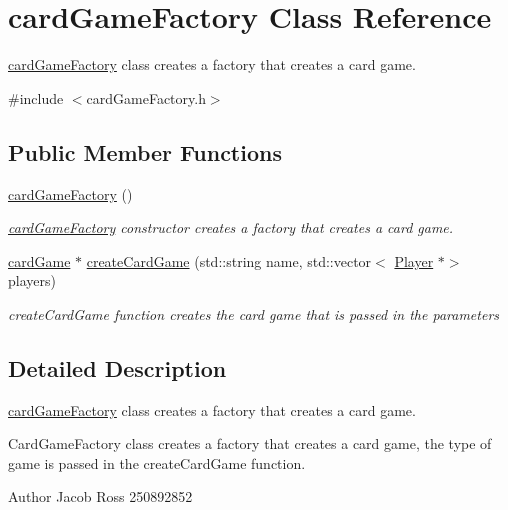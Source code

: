 \hypertarget{classcardGameFactory}{}\section{card\+Game\+Factory Class Reference}
\label{classcardGameFactory}


\hyperlink{classcardGameFactory}{card\+Game\+Factory} class creates a factory that creates a card game.  




{\ttfamily \#include $<$card\+Game\+Factory.\+h$>$}

\subsection*{Public Member Functions}
\begin{DoxyCompactItemize}
\item 
\hyperlink{classcardGameFactory_a459f1b1dcf3366a7d8ed80fa50caf1f1}{card\+Game\+Factory} ()
\begin{DoxyCompactList}\small\item\em \hyperlink{classcardGameFactory}{card\+Game\+Factory} constructor creates a factory that creates a card game. \end{DoxyCompactList}\item 
\hyperlink{classcardGame}{card\+Game} $\ast$ \hyperlink{classcardGameFactory_a9edb0e4817b525169a6346ad687542e2}{create\+Card\+Game} (std\+::string name, std\+::vector$<$ \hyperlink{classPlayer}{Player} $\ast$$>$ players)
\begin{DoxyCompactList}\small\item\em create\+Card\+Game function creates the card game that is passed in the parameters \end{DoxyCompactList}\end{DoxyCompactItemize}


\subsection{Detailed Description}
\hyperlink{classcardGameFactory}{card\+Game\+Factory} class creates a factory that creates a card game. 

Card\+Game\+Factory class creates a factory that creates a card game, the type of game is passed in the create\+Card\+Game function. \begin{DoxyAuthor}{Author}
Jacob Ross 250892852 
\end{DoxyAuthor}


